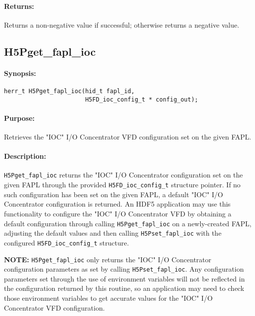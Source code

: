 \documentclass[../main.tex]{subfiles}
\begin{document}
\paragraph{Returns:}
\begin{flushleft}%
Returns a non-negative value if successful; otherwise returns a negative value.
\end{flushleft}%

\newpage

\subsection{H5Pget\_fapl\_ioc}
\label{ref:h5p_get_fapl_ioc}

\paragraph{Synopsis:}
\begin{flushleft}%
\begin{verbatim}
herr_t H5Pget_fapl_ioc(hid_t fapl_id,
                       H5FD_ioc_config_t * config_out);
\end{verbatim}
\end{flushleft}%

\paragraph{Purpose:}
\begin{flushleft}%
Retrieves the "IOC" I/O Concentrator \Gls{VFD} configuration set on the given \Gls{FAPL}.
\end{flushleft}%

\paragraph{Description:}
\begin{flushleft}%
\texttt{H5Pget\_fapl\_ioc} returns the "IOC" I/O Concentrator configuration set
on the given \Gls{FAPL} through the provided \texttt{H5FD\_ioc\_config\_t}
structure pointer. If no such configuration has been set on the given FAPL,
a default "IOC" I/O Concentrator configuration is returned. An HDF5 application
may use this functionality to configure the "IOC" I/O Concentrator VFD by obtaining
a default configuration through calling \texttt{H5Pget\_fapl\_ioc} on a newly-created
\Gls{FAPL}, adjusting the default values and then calling \texttt{H5Pset\_fapl\_ioc}
with the configured \texttt{H5FD\_ioc\_config\_t} structure.

\textbf{NOTE:} \texttt{H5Pget\_fapl\_ioc} only returns the "IOC" I/O Concentrator
configuration parameters as set by calling \texttt{H5Pset\_fapl\_ioc}. Any
configuration parameters set through the use of environment variables will not
be reflected in the configuration returned by this routine, so an application may
need to check those environment variables to get accurate values for the "IOC" I/O
Concentrator VFD configuration.
\end{flushleft}%
\end{document}
